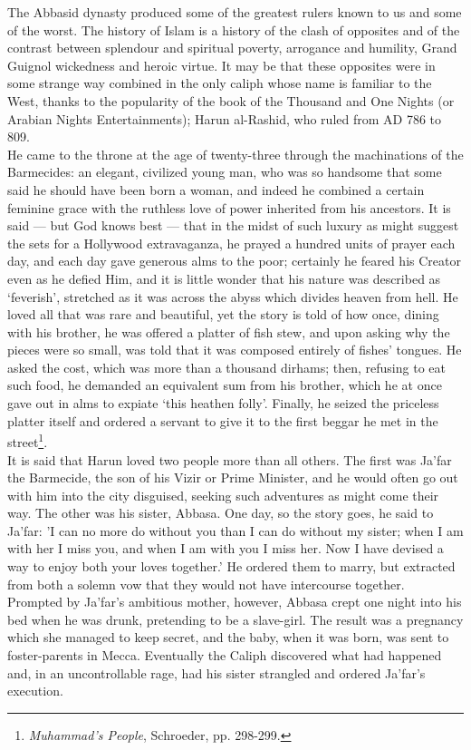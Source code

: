 \documentclass[10pt, twoside]{book}
\begin{document}
The Abbasid dynasty produced some of the greatest rulers known to us and some of the worst. The 
history of Islam is a history of the clash of opposites and of the contrast between splendour and 
spiritual poverty, arrogance and humility, Grand Guignol wickedness and heroic virtue. It may be that 
these opposites were in some strange way combined in the only caliph whose name is familiar to the 
West, thanks to the popularity of the book of the Thousand and One Nights (or Arabian Nights 
Entertainments); Harun al\hyp{}Rashid, who ruled from AD 786 to 809. \\

He came to the throne at the age of twenty\hyp{}three through the machinations of the Barmecides: an 
elegant, civilized young man, who was so handsome that some said he should have been born a woman, 
and indeed he combined a certain feminine grace with the ruthless love of power inherited from his 
ancestors. It is said --- but God knows best --- that in the midst of such luxury as might suggest the 
sets for a Hollywood extravaganza, he prayed a hundred units of prayer each day, and each day gave 
generous alms to the poor; certainly he feared his Creator even as he defied Him, and it is little 
wonder that his nature was described as `feverish', stretched as it was across the abyss which 
divides heaven from hell. He loved all that was rare and beautiful, yet the story is told of how 
once, dining with his brother, he was offered a platter of fish stew, and upon asking why the pieces 
were so small, was told that it was composed entirely of fishes' tongues. He asked the cost, which 
was more than a thousand dirhams; then, refusing to eat such food, he demanded an equivalent sum from 
his brother, which he at once gave out in alms to expiate `this heathen folly'. Finally, he seized 
the priceless platter itself and ordered a servant to give it to the first beggar he met in the 
street\footnote{\emph{Muhammad's People}, Schroeder, pp. 298-299.}. \\

It is said that Harun loved two people more than all others. The first was Ja'far the Barmecide, the 
son of his Vizir or Prime Minister, and he would often go out with him into the city disguised, 
seeking such adventures as might come their way. The other was his sister, Abbasa. One day, so the 
story goes, he said to Ja'far: 'I can no more do without you than I can do without my sister; when I 
am with her I miss you, and when I am with you I miss her. Now I have devised a way to enjoy both 
your loves together.' He ordered them to marry, but extracted from both a solemn vow that they would 
not have intercourse together. Prompted by Ja'far's ambitious mother, however, Abbasa crept one night 
into his bed when he was drunk, pretending to be a slave\hyp{}girl. The result was a pregnancy which she 
managed to keep secret, and the baby, when it was born, was sent to foster\hyp{}parents in Mecca. 
Eventually the Caliph discovered what had happened and, in an uncontrollable rage, had his sister 
strangled and ordered Ja'far's execution. \\
\end{document}
